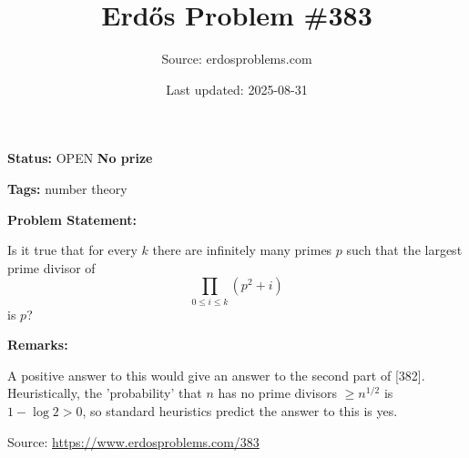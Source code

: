 \documentclass{article}
\title{Erd\H{o}s Problem \#383}
\date{Last updated: 2025-08-31}
\author{Source: erdosproblems.com}
\begin{document}
\maketitle

\noindent\textbf{Status:} OPEN \quad \textbf{No prize}

\noindent\textbf{Tags:} number theory

\medskip
\noindent\textbf{Problem Statement:}

Is it true that for every $k$ there are infinitely many primes $p$ such that the largest prime divisor of\[\prod_{0\leq i\leq k}(p^2+i)\]is $p$?

\bigskip
\noindent\textbf{Remarks:}

A positive answer to this would give an answer to the second part of [382]. Heuristically, the 'probability' that $n$ has no prime divisors $\geq n^{1/2}$ is $1-\log 2>0$, so standard heuristics predict the answer to this is yes.

\bigskip
\noindent\small{Source: \url{https://www.erdosproblems.com/383}}
\end{document}
